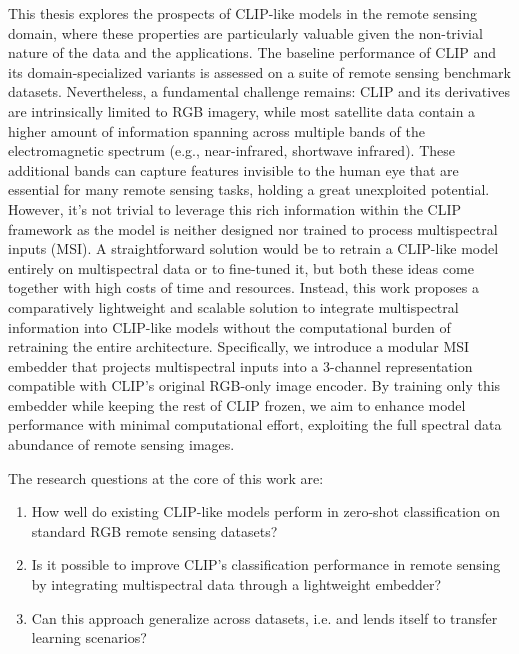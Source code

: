 \documentclass[a4paper, oneside, english]{sapthesis} %
\begin{document}
This thesis explores the prospects of CLIP-like models in the remote sensing domain, where these properties are particularly valuable given the non-trivial nature of the data and the applications. The baseline performance of CLIP and its domain-specialized variants \cite{liu2024remoteclip} \cite{zhang2024rs5m} \cite{wang2024skyscript} is assessed on a suite of remote sensing benchmark datasets. Nevertheless, a fundamental challenge remains: CLIP and its derivatives are intrinsically limited to RGB imagery, while most satellite data contain a higher amount of information spanning across multiple bands of the electromagnetic spectrum (e.g., near-infrared, shortwave infrared). These additional bands can capture features invisible to the human eye that are essential for many remote sensing tasks, holding a great unexploited potential. However, it's not trivial to leverage this rich information within the CLIP framework as the model is neither designed nor trained to process multispectral inputs (MSI). A straightforward solution would be to retrain a CLIP-like model entirely on multispectral data \cite{marimo2025beyond} or to fine-tuned it, but both these ideas come together with high costs of time and resources. Instead, this work proposes a comparatively lightweight and scalable solution to integrate multispectral information into CLIP-like models without the computational burden of retraining the entire architecture. Specifically, we introduce a modular MSI embedder that projects multispectral inputs into a 3-channel representation compatible with CLIP's original RGB-only image encoder. By training only this embedder while keeping the rest of CLIP frozen, we aim to enhance model performance with minimal computational effort, exploiting the full spectral data abundance of remote sensing images.

The research questions at the core of this work are:

\begin{enumerate}
    \item How well do existing CLIP-like models perform in zero-shot classification on standard RGB remote sensing datasets?
    \item Is it possible to improve CLIP’s classification performance in remote sensing by integrating multispectral data through a lightweight embedder?
    \item Can this approach generalize across datasets, i.e. and lends itself to transfer learning scenarios?
\end{enumerate}
\end{document}
